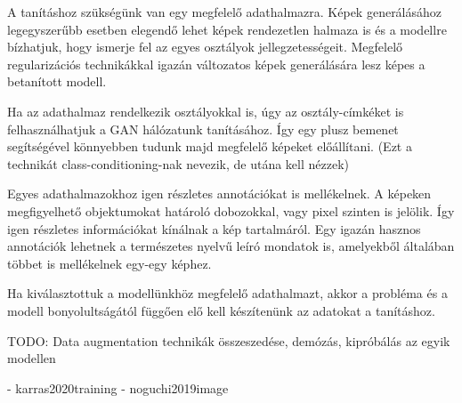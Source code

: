 


A tanításhoz szükségünk van egy megfelelő adathalmazra. Képek generálásához legegyszerűbb esetben elegendő lehet képek rendezetlen halmaza is és a modellre bízhatjuk, hogy ismerje fel az egyes osztályok jellegzetességeit. Megfelelő regularizációs technikákkal igazán változatos képek generálására lesz képes a betanított modell.

Ha az adathalmaz rendelkezik osztályokkal is, úgy az osztály-címkéket is felhasználhatjuk a GAN hálózatunk tanításához. Így egy plusz bemenet segítségével könnyebben tudunk majd megfelelő képeket előállítani. (Ezt a technikát class-conditioning-nak nevezik, de utána kell nézzek)

Egyes adathalmazokhoz igen részletes annotációkat is mellékelnek. A képeken megfigyelhető objektumokat határoló dobozokkal, vagy pixel szinten is jelölik. Így igen részletes információkat kínálnak a kép tartalmáról. Egy igazán hasznos annotációk lehetnek a természetes nyelvű leíró mondatok is, amelyekből általában többet is mellékelnek egy-egy képhez.

Ha kiválasztottuk a modellünkhöz megfelelő adathalmazt, akkor a probléma és a modell bonyolultságától függően elő kell készítenünk az adatokat a tanításhoz.

TODO: Data augmentation technikák összeszedése, demózás, kipróbálás az egyik modellen


- karras2020training
- noguchi2019image